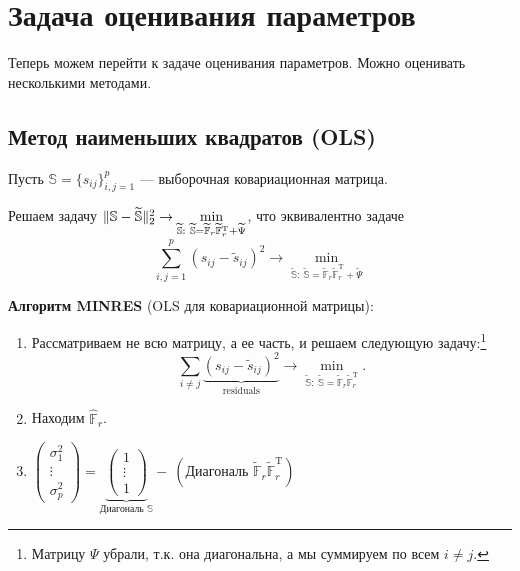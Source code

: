 \documentclass[specialist, 12pt,
subf, %
href, colorlinks=true,
substylefile = spbu.rtx,
]{disser}
\begin{document}
\section{Задача оценивания параметров}
Теперь можем перейти к задаче оценивания параметров. Можно оценивать несколькими методами.

\subsection{Метод наименьших квадратов (OLS)}

Пусть $\mathbb{S}=\{s_{ij}\}_{i,j=1}^p$ --- выборочная ковариационная матрица.

Решаем задачу $\Arrowvert \mathbb{S}-\widetilde{\mathbb{S}}\Arrowvert_2^2 \to \min\limits_{\widetilde{\mathbb{S}}:~ \widetilde{\mathbb{S}}=\widetilde{\mathbb{F}}_r\widetilde{\mathbb{F}}_r^\mathrm{T}+\widetilde{\Psi}}$, что эквивалентно задаче
\begin{equation*}
\sum\limits_{i,j=1}^p (s_{ij}-\widetilde{s}_{ij})^2\to \min\limits_{\widetilde{\mathbb{S}}:~ \widetilde{\mathbb{S}}=\widetilde{\mathbb{F}}_r\widetilde{\mathbb{F}}_r^\mathrm{T}+\widetilde{\Psi}}
\end{equation*}

\textbf{Алгоритм MINRES} (OLS для ковариационной матрицы):
\begin{enumerate}
	\item Рассматриваем не всю матрицу, а ее часть, и решаем следующую задачу:\footnote{Матрицу $\Psi$ убрали, т.к. она диагональна, а мы суммируем по всем $i\ne j$.}
	\begin{equation*}
	\sum\limits_{i\ne j} \underbrace{(s_{ij}-\widetilde{s}_{ij})^2}_{\text{residuals}}\to \min\limits_{\widetilde{\mathbb{S}}:~ \widetilde{\mathbb{S}}=\widetilde{\mathbb{F}}_r\widetilde{\mathbb{F}}_r^\mathrm{T}}.
	\end{equation*}
    \item Находим $\hat{\mathbb{F}}_r$.%
    \item $\left( \begin{matrix}
    	\sigma_1^2 \\
    	\vdots \\
    	\sigma_p^2
    	\end{matrix} \right) = \underbrace{\left( \begin{matrix}
    	1 \\
    	\vdots \\
    	1
    	\end{matrix} \right)}_{\text{Диагональ } \mathbb{S}} -~ (\text{Диагональ }\widetilde{\mathbb{F}}_r\widetilde{\mathbb{F}}_r^\mathrm{T})$
\end{enumerate}
\end{document}
